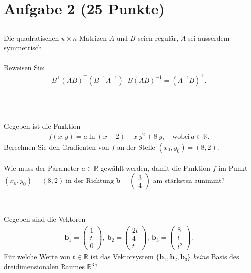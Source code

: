 \newpage
\section*{Aufgabe 2 (25 Punkte)}
\vspace{0.4cm}
\subsection*{}
Die quadratischen $ n \times n $ Matrizen $ A $ und $ B $ seien regulär, $ A $ sei ausserdem symmetrisch.\\
\\
Beweisen Sie:
\begin{align*}
B^\top (AB)^\top (B^{-1} A^{-1})^\top B (A B)^{-1}
=
(A^{-1} B )^\top.
\end{align*}
\\
\\
\subsection*{}
Gegeben ist die Funktion
\begin{align*}
f(x,y) = a \ln(x-2) + x \ y^2 + 8 \ y, \quad \textrm{wobei} \ a \in \mathbb{R}.
\end{align*}
Berechnen Sie den Gradienten von $ f $ an der Stelle $ (x_0,y_0) = (8,2) $.\\
\\
Wie muss der Parameter $ a \in \mathbb{R} $ gewählt werden, damit die Funktion $ f $ im Punkt $ (x_0,y_0) = (8,2) $ in der Richtung
$ \textbf{b} = \begin{pmatrix}
3 \\
4
\end{pmatrix} $ am stärksten zunimmt?\\
\\
\subsection*{}
Gegeben sind die Vektoren
\begin{align*}
\textbf{b}_1 =
\begin{pmatrix}
1 \\
t\\ 
0
\end{pmatrix},
\
\textbf{b}_2 =
\begin{pmatrix}
2t \\
4\\ 
t
\end{pmatrix},
\
\textbf{b}_3 =
\begin{pmatrix}
8 \\
t\\ 
t^2
\end{pmatrix}.
\end{align*}
Für welche Werte von $ t \in \mathbb{R} $ ist das Vektorsystem $ \{ \textbf{b}_1, \textbf{b}_2, \textbf{b}_3 \} $ \textit{keine} Basis des dreidimensionalen Raumes $ \mathbb{R}^3 $?
\\
\\
